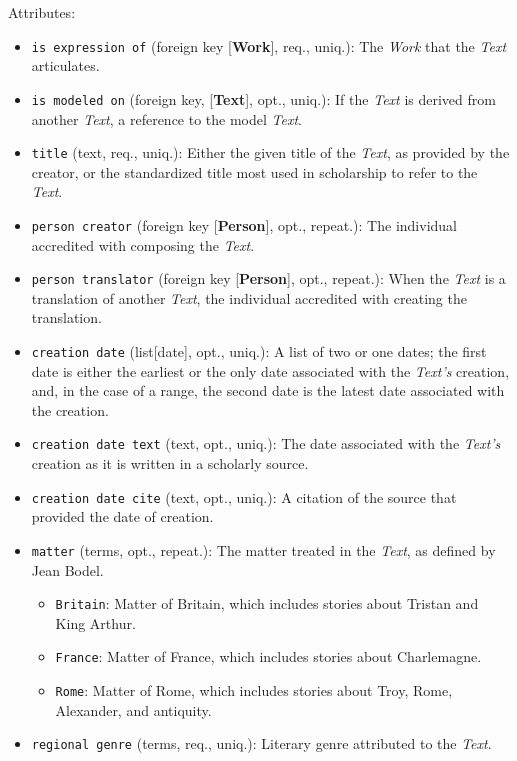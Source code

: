 \vspace{1em}
\noindent Attributes:
\begin{itemize}
    \item \texttt{is expression of} (foreign key [\textbf{Work}], req., uniq.): The \textit{Work} that the \textit{Text} articulates.
    \item \texttt{is modeled on} (foreign key, [\textbf{Text}], opt., uniq.): If the \textit{Text} is derived from another \textit{Text}, a reference to the model \textit{Text}.
    \item \texttt{title} (text, req., uniq.): Either the given title of the \textit{Text}, as provided by the creator, or the standardized title most used in scholarship to refer to the \textit{Text}.
    \item \texttt{person creator} (foreign key [\textbf{Person}], opt., repeat.): The individual accredited with composing the \textit{Text}.
    \item \texttt{person translator} (foreign key [\textbf{Person}], opt., repeat.): When the \textit{Text} is a translation of another \textit{Text}, the individual accredited with creating the translation.
    \item \texttt{creation date} (list[date], opt., uniq.): A list of two or one dates; the first date is either the earliest or the only date associated with the \textit{Text's} creation, and, in the case of a range, the second date is the latest date associated with the creation.
    \item \texttt{creation date text} (text, opt., uniq.): The date associated with the \textit{Text's} creation as it is written in a scholarly source.
    \item \texttt{creation date cite} (text, opt., uniq.): A citation of the source that provided the date of creation.
    \item \texttt{matter} (terms, opt., repeat.): The matter treated in the \textit{Text}, as defined by Jean Bodel.
    \begin{itemize}
        \item \texttt{Britain}: Matter of Britain, which includes stories about Tristan and King Arthur.
        \item \texttt{France}: Matter of France, which includes stories about Charlemagne.
        \item \texttt{Rome}: Matter of Rome, which includes stories about Troy, Rome, Alexander, and antiquity.
    \end{itemize}
    \item \texttt{regional genre} (terms, req., uniq.): Literary genre attributed to the \textit{Text}.

\end{itemize}
